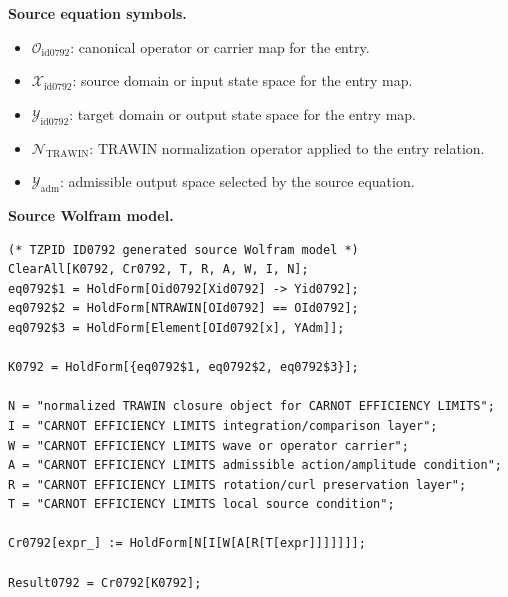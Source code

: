 \begin{minipage}[t]{0.49\linewidth}
\begingroup
\small
\raggedright
\textbf{Source equation symbols.}\par
\begin{itemize}[leftmargin=1.35em,itemsep=1pt,topsep=1pt,parsep=0pt]
    \item $\mathcal{O}_{\mathrm{id0792}}$: canonical operator or carrier map for the entry.
    \item $\mathcal{X}_{\mathrm{id0792}}$: source domain or input state space for the entry map.
    \item $\mathcal{Y}_{\mathrm{id0792}}$: target domain or output state space for the entry map.
    \item $\mathcal{N}_{\mathrm{TRAWIN}}$: TRAWIN normalization operator applied to the entry relation.
    \item $\mathcal{Y}_{\mathrm{adm}}$: admissible output space selected by the source equation.
\end{itemize}
\endgroup
\end{minipage}\hfill
\begin{minipage}[t]{0.47\linewidth}
\begingroup
\scriptsize
\raggedright
\textbf{Source Wolfram model.}\par
\begin{Verbatim}[fontsize=\tiny,breaklines=true,breakanywhere=true]
(* TZPID ID0792 generated source Wolfram model *)
ClearAll[K0792, Cr0792, T, R, A, W, I, N];
eq0792$1 = HoldForm[Oid0792[Xid0792] -> Yid0792];
eq0792$2 = HoldForm[NTRAWIN[OId0792] == OId0792];
eq0792$3 = HoldForm[Element[OId0792[x], YAdm]];

K0792 = HoldForm[{eq0792$1, eq0792$2, eq0792$3}];

N = "normalized TRAWIN closure object for CARNOT EFFICIENCY LIMITS";
I = "CARNOT EFFICIENCY LIMITS integration/comparison layer";
W = "CARNOT EFFICIENCY LIMITS wave or operator carrier";
A = "CARNOT EFFICIENCY LIMITS admissible action/amplitude condition";
R = "CARNOT EFFICIENCY LIMITS rotation/curl preservation layer";
T = "CARNOT EFFICIENCY LIMITS local source condition";

Cr0792[expr_] := HoldForm[N[I[W[A[R[T[expr]]]]]]];

Result0792 = Cr0792[K0792];
\end{Verbatim}
\endgroup
\end{minipage}

